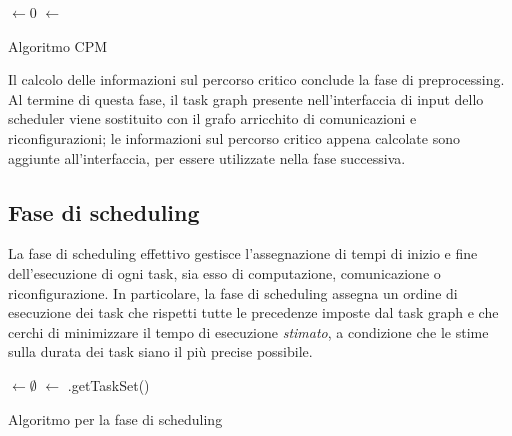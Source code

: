 \IncMargin{1em}
\begin{algorithm}[!htbp]
 
 \BlankLine
  $\leftarrow 0$\;
  $\leftarrow$ \;
 \caption{Algoritmo CPM}
\label{alg:CPM}
\end{algorithm}
\DecMargin{1em}

Il calcolo delle informazioni sul percorso critico conclude la fase di 
preprocessing. Al termine di questa fase, il task graph presente 
nell'interfaccia di input dello scheduler viene sostituito con il grafo 
arricchito di comunicazioni e riconfigurazioni; le informazioni sul percorso 
critico appena calcolate sono aggiunte all'interfaccia, per essere utilizzate 
nella fase successiva.


\subsection{Fase di scheduling}
\label{subsec:faseScheduling}
La fase di scheduling effettivo gestisce l'assegnazione di tempi di inizio e 
fine dell'esecuzione di ogni task, sia esso di computazione, comunicazione o 
riconfigurazione. In particolare, la fase di scheduling assegna un ordine di 
esecuzione dei task che rispetti tutte le precedenze imposte dal task graph e 
che cerchi di minimizzare il tempo di esecuzione \emph{stimato}, a condizione
che le stime sulla durata dei task siano il più precise possibile.

\IncMargin{1em}
\begin{algorithm}[!htbp]
 
 \BlankLine
 \SchedulerOutput $\leftarrow \emptyset$\;
 \UnscheduledSet $\leftarrow$ \SchedulerInput.getTaskSet()\;
 \Return{\SchedulerOutput}
\caption{Algoritmo per la fase di scheduling}
\label{alg:faseScheduling}
\end{algorithm}
\DecMargin{1em}

